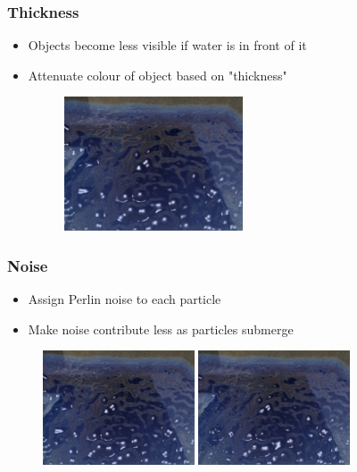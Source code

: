 \documentclass{beamer}
\begin{document}
	\begin{frame}[t]\frametitle{Thickness}
	    \begin{itemize}
	    	\item Objects become less visible if water is in front of it
	    	\item Attenuate colour of object based on "thickness"
	    	\begin{figure}
	    		\centering
	    		\includegraphics[width=0.5\textwidth]{curvature_water.png}
	    	\end{figure}
	    \end{itemize}
	\end{frame}
	\begin{frame}[t]\frametitle{Noise}
	    \begin{itemize}
	    	\item Assign Perlin noise to each particle
	    	\item Make noise contribute less as particles submerge
	    \end{itemize}
	    \begin{figure}
			\centering
			\includegraphics[width=0.4\textwidth]{curvature_water.png}
			\hspace{1em}
			\includegraphics[width=0.4\textwidth]{noise_water.png}
		\end{figure}
	\end{frame}
\end{document}

